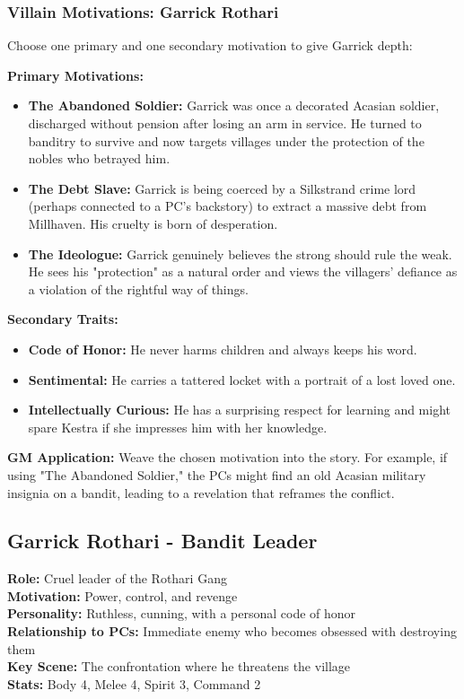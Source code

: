 \documentclass[11pt]{article}
\newenvironment{characterbox}[1]{%
  \begin{mdframed}[backgroundcolor=shadecolor, linewidth=1pt, linecolor=headercolor]%
  \subsection*{#1}%
}{%
  \end{mdframed}%
}
\newenvironment{mechanic}[1]{%
  \begin{mdframed}[backgroundcolor=tableheader, linewidth=1pt, linecolor=accentcolor]%
  \subsubsection*{#1}%
}{%
  \end{mdframed}%
}
\begin{document}
\begin{mechanic}{Villain Motivations: Garrick Rothari}

Choose one primary and one secondary motivation to give Garrick depth:

\textbf{Primary Motivations:}
\begin{itemize}
\item \textbf{The Abandoned Soldier:} Garrick was once a decorated Acasian soldier, discharged without pension after losing an arm in service. He turned to banditry to survive and now targets villages under the protection of the nobles who betrayed him.
\item \textbf{The Debt Slave:} Garrick is being coerced by a Silkstrand crime lord (perhaps connected to a PC's backstory) to extract a massive debt from Millhaven. His cruelty is born of desperation.
\item \textbf{The Ideologue:} Garrick genuinely believes the strong should rule the weak. He sees his "protection" as a natural order and views the villagers' defiance as a violation of the rightful way of things.
\end{itemize}

\textbf{Secondary Traits:}
\begin{itemize}
\item \textbf{Code of Honor:} He never harms children and always keeps his word.
\item \textbf{Sentimental:} He carries a tattered locket with a portrait of a lost loved one.
\item \textbf{Intellectually Curious:} He has a surprising respect for learning and might spare Kestra if she impresses him with her knowledge.
\end{itemize}

\textbf{GM Application:} Weave the chosen motivation into the story. For example, if using "The Abandoned Soldier," the PCs might find an old Acasian military insignia on a bandit, leading to a revelation that reframes the conflict.

\end{mechanic}

\begin{characterbox}{Garrick Rothari - Bandit Leader}
\textbf{Role:} Cruel leader of the Rothari Gang \\
\textbf{Motivation:} Power, control, and revenge \\
\textbf{Personality:} Ruthless, cunning, with a personal code of honor \\
\textbf{Relationship to PCs:} Immediate enemy who becomes obsessed with destroying them \\
\textbf{Key Scene:} The confrontation where he threatens the village \\
\textbf{Stats:} Body 4, Melee 4, Spirit 3, Command 2
\end{characterbox}
\end{document}

